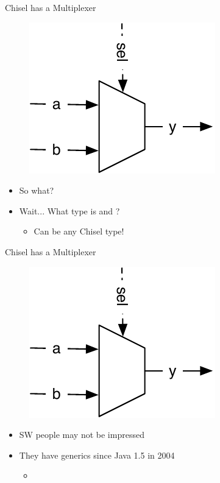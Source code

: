 \begin{frame}[fragile]{Chisel has a Multiplexer}
\begin{figure}
  \includegraphics[scale=\scale]{../figures/mux}
\end{figure}
\begin{itemize}
\item So what?
\item Wait... What type is  and ?
\begin{itemize}
\item Can be any Chisel type!
\end{itemize}
\end{itemize}
\end{frame}

\begin{frame}[fragile]{Chisel has a Multiplexer}
\begin{figure}
  \includegraphics[scale=\scale]{../figures/mux}
\end{figure}
\begin{itemize}
\item SW people may not be impressed
\item They have generics since Java 1.5 in 2004
\begin{itemize}
\item {}
\end{itemize}
\end{itemize}
\end{frame}



